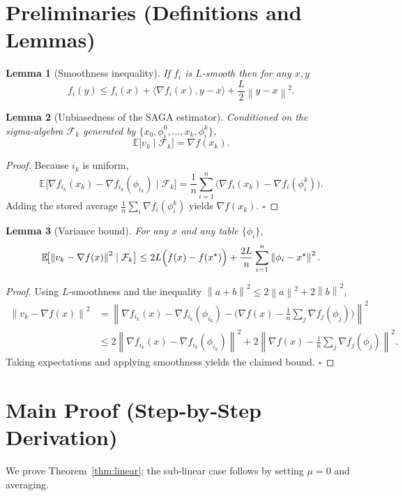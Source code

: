 \documentclass[12pt]{article}
\newtheorem{lemma}{Lemma}
\newcommand{\E}{\mathbb{E}}
\newcommand{\grad}{\nabla}
\newcommand{\norm}[1]{\left\| #1\right\|}
\newcommand{\inner}[2]{\langle #1,#2\rangle}
\begin{document}
\section*{Preliminaries (Definitions and Lemmas)}
\begin{lemma}[Smoothness inequality]\label{lem:smooth}
If $f_i$ is $L$‑smooth then for any $x,y$
\[
f_i(y)\le f_i(x)+\inner{\grad f_i(x)}{y-x}+\frac{L}{2}\norm{y-x}^{2}.
\]
\end{lemma}
\begin{lemma}[Unbiasedness of the SAGA estimator]\label{lem:unbiased}
Conditioned on the sigma‑algebra $\mathcal{F}_k$ generated by $\{x_0,\phi_i^{0},\dots ,x_k,\phi_i^{k}\}$,
\[
\E\!\bigl[v_k\mid\mathcal{F}_k\bigr]=\grad f(x_k).
\]
\end{lemma}
\begin{proof}
Because $i_k$ is uniform,
\[
\E\!\bigl[\grad f_{i_k}(x_k)-\grad f_{i_k}(\phi_{i_k})\mid\mathcal{F}_k\bigr]
= \frac1n\sum_{i=1}^{n}\bigl(\grad f_i(x_k)-\grad f_i(\phi_i^{k})\bigr).
\]
Adding the stored average $\frac1n\sum_i\grad f_i(\phi_i^{k})$ yields $\grad f(x_k)$. \hfill $\square$
\end{proof}
\begin{lemma}[Variance bound]\label{lem:var}
For any $x$ and any table $\{\phi_i\}$,
\[
\E\!\bigl[\norm{v_k-\grad f(x)}^{2}\mid\mathcal{F}_k\bigr]
\le 2L\Bigl(f(x)-f(x^{\star})\Bigr)
    +\frac{2L}{n}\sum_{i=1}^{n}\norm{\phi_i-x^{\star}}^{2}.
\]
\end{lemma}
\begin{proof}
Using $L$‑smoothness and the inequality
$\norm{a+b}^{2}\le2\norm{a}^{2}+2\norm{b}^{2}$,
\begin{align*}
\norm{v_k-\grad f(x)}^{2}
&=\norm{\grad f_{i_k}(x)-\grad f_{i_k}(\phi_{i_k})
      -\bigl(\grad f(x)-\frac1n\sum_{j}\grad f_j(\phi_j)\bigr)}^{2}\\
&\le 2\norm{\grad f_{i_k}(x)-\grad f_{i_k}(\phi_{i_k})}^{2}
   +2\norm{\grad f(x)-\frac1n\sum_{j}\grad f_j(\phi_j)}^{2}.
\end{align*}
Taking expectations and applying smoothness yields the claimed bound.  \hfill $\square$
\end{proof}

\section*{Main Proof (Step‑by‑Step Derivation)}
We prove Theorem~\ref{thm:linear}; the sub‑linear case follows by setting $\mu=0$ and averaging.
\end{document}
